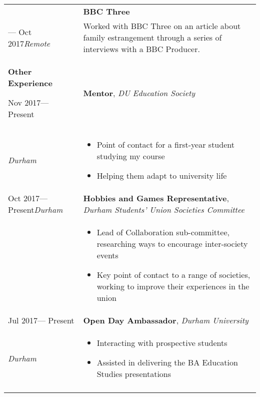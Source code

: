 \documentclass[12pt, a4paper]{article}
\newcommand{\smitem}[1]{\item {\small {#1}}}
\newenvironment{bullets}{\begin{minipage}[t]{\linewidth}\begin{itemize}[leftmargin=2em,label=-,nosep]}{\end{itemize}\end{minipage}\vspace{5pt}}
\newenvironment{sectionitem}{\vspace{6pt}\noindent\tabularx{\linewidth}{p{70pt}X}}{\endtabularx}
\newcommand{\sectionheader}[1]{
	\vspace{6pt}
	{
		\noindent
		\Large\textbf{#1}}}
\begin{document}
	\noindent
	\begin{tabularx}{\textwidth}{X|X}
	
		\begin{minipage}[t]{\linewidth}
			\begin{sectionitem}
				Jul 2017&\textbf{BBC Three}\\
				--- Oct 2017\newline\emph{Remote}&Worked with BBC Three on an article about family estrangement through a series of interviews with a BBC Producer.\\
			\end{sectionitem}
		
			\sectionheader{Other Experience}
			
			\begin{sectionitem}
				Nov 2017\newline--- Present&\textbf{Mentor}, \emph{DU Education Society}\\
				\emph{Durham}&\begin{bullets}
					\smitem{Point of contact for a first-year student studying my course}
					\smitem{Helping them adapt to university life}
				\end{bullets}\\
			\end{sectionitem}
		
			\begin{sectionitem}
				Oct 2017\newline --- Present\newline\emph{Durham}&\textbf{Hobbies and Games Representative}, \emph{Durham Students' Union Societies Committee}\\
				&\begin{bullets}
					\smitem{Lead of Collaboration sub-committee, researching ways to encourage inter-society events}
					\smitem{Key point of contact to a range of societies, working to improve their experiences in the union}
				\end{bullets}\\
			\end{sectionitem}
		
			\begin{sectionitem}
				Jul 2017\newline --- Present&\textbf{Open Day Ambassador}, \emph{Durham University}\\
				\emph{Durham}&\begin{bullets}
					\smitem{Interacting with prospective students}
					\smitem{Assisted in delivering the BA Education Studies presentations}
				\end{bullets}\\
			\end{sectionitem}
		

\end{minipage}
\end{tabularx}
\end{document}
